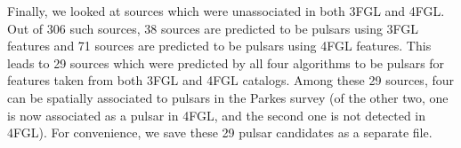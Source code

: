 \begin{table}[!h]
    \vspace{0.2cm}
    \caption{For definitions see Table \ref{tab:3FGL_prediction}.}
    \label{tab:4FGL_prediction}
\end{table}

Finally, we looked at sources which were unassociated in both 3FGL and 4FGL. Out of 306 such sources, 38 sources are predicted to be pulsars using 3FGL features and 71 sources are predicted to be pulsars using 4FGL features. This leads to 29 sources which were predicted by all four algorithms to be pulsars for features taken from both 3FGL and 4FGL catalogs. Among these 29 sources, four can be spatially associated to pulsars in the Parkes survey (of the other two, one is now associated as a pulsar in 4FGL, and the second one is not detected in 4FGL).  For convenience, we save these 29 pulsar candidates as a separate file.




